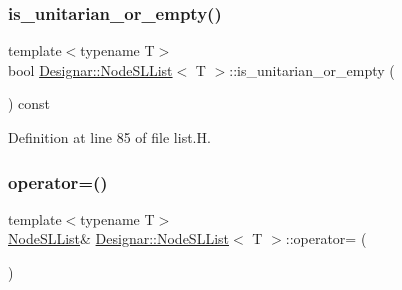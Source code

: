 \subsubsection{\texorpdfstring{is\+\_\+unitarian\+\_\+or\+\_\+empty()}{is\_unitarian\_or\_empty()}}
{\footnotesize\ttfamily template$<$typename T$>$ \\
bool \hyperlink{class_designar_1_1_node_s_l_list}{Designar\+::\+Node\+S\+L\+List}$<$ T $>$\+::is\+\_\+unitarian\+\_\+or\+\_\+empty (\begin{DoxyParamCaption}{ }\end{DoxyParamCaption}) const\hspace{0.3cm}{\ttfamily [inline]}}



Definition at line 85 of file list.\+H.

\mbox{\label{class_designar_1_1_node_s_l_list_a31a9e8aea9795ba5c2bf4f146f8cfe57}} 
\subsubsection{\texorpdfstring{operator=()}{operator=()}\hspace{0.1cm}{\footnotesize\ttfamily [1/2]}}
{\footnotesize\ttfamily template$<$typename T$>$ \\
\hyperlink{class_designar_1_1_node_s_l_list}{Node\+S\+L\+List}\& \hyperlink{class_designar_1_1_node_s_l_list}{Designar\+::\+Node\+S\+L\+List}$<$ T $>$\+::operator= (\begin{DoxyParamCaption}\item[{const \hyperlink{class_designar_1_1_node_s_l_list}{Node\+S\+L\+List}$<$ T $>$ \&}]{ }\end{DoxyParamCaption})\hspace{0.3cm}{\ttfamily [delete]}}

\mbox{\label{class_designar_1_1_node_s_l_list_a1b35741a071a185842be3604b44fc003}} 
